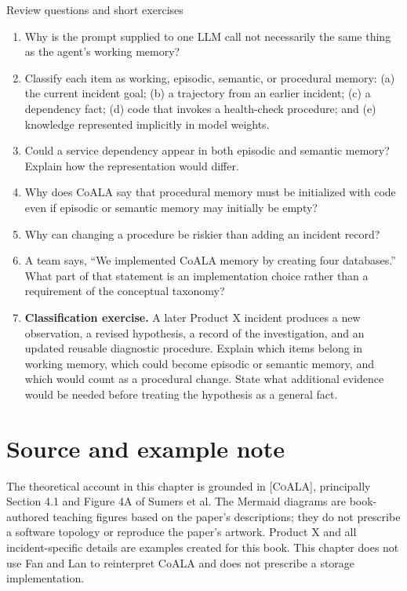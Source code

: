 \begin{reviewquestions}{Review questions and short exercises}
\begin{enumerate}
  \item Why is the prompt supplied to one LLM call not necessarily the same thing as the agent's working memory?
  \item Classify each item as working, episodic, semantic, or procedural memory: (a) the current incident goal; (b) a trajectory from an earlier incident; (c) a dependency fact; (d) code that invokes a health-check procedure; and (e) knowledge represented implicitly in model weights.
  \item Could a service dependency appear in both episodic and semantic memory? Explain how the representation would differ.
  \item Why does CoALA say that procedural memory must be initialized with code even if episodic or semantic memory may initially be empty?
  \item Why can changing a procedure be riskier than adding an incident record?
  \item A team says, ``We implemented CoALA memory by creating four databases.'' What part of that statement is an implementation choice rather than a requirement of the conceptual taxonomy?
  \item \textbf{Classification exercise.} A later Product X incident produces a new observation, a revised hypothesis, a record of the investigation, and an updated reusable diagnostic procedure. Explain which items belong in working memory, which could become episodic or semantic memory, and which would count as a procedural change. State what additional evidence would be needed before treating the hypothesis as a general fact.
\end{enumerate}
\end{reviewquestions}

\section*{Source and example note}
The theoretical account in this chapter is grounded in \textsc{[CoALA]}, principally Section 4.1 and Figure 4A of Sumers et al. The Mermaid diagrams are book-authored teaching figures based on the paper's descriptions; they do not prescribe a software topology or reproduce the paper's artwork. Product X and all incident-specific details are examples created for this book. This chapter does not use Fan and Lan to reinterpret CoALA and does not prescribe a storage implementation.

